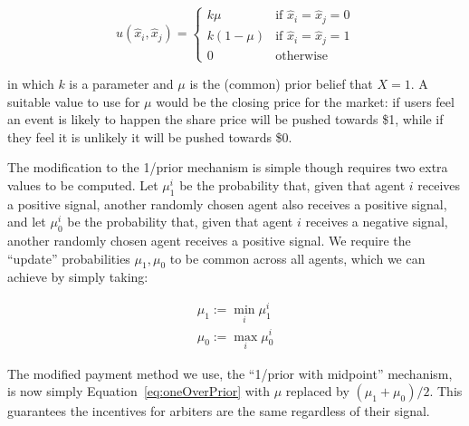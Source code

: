 \begin{equation}
	\label{eq:oneOverPrior}
	u(\hat{x}_i, \hat{x}_j) =
	\begin{cases}
		k \mu & \text{if } \hat{x}_i = \hat{x}_j = 0 \\
		k (1-\mu) & \text{if } \hat{x}_i = \hat{x}_j = 1 \\
		0 & \text{otherwise}
	\end{cases}
\end{equation}

in which $k$ is a parameter and $\mu$ is the (common) prior belief that $X=1$.
A suitable value to use for $\mu$ would be the closing price for the market: if
users feel an event is likely to happen the share price will be pushed towards
\$1, while if they feel it is unlikely it will be pushed towards \$0.

The modification to the 1/prior mechanism is simple though requires two extra
values to be computed. Let $\mu_1^i$ be the probability that, given that agent
$i$ receives a positive signal, another randomly chosen agent also receives a
positive signal, and let $\mu_0^i$ be the probability that, given that agent
$i$ receives a negative signal, another randomly chosen agent receives a
positive signal. We require the ``update'' probabilities $\mu_1, \mu_0$ to be
common across all agents, which we can achieve by simply taking:

\begin{equation}
	\begin{gathered}
		\mu_1 := \min_i \mu_1^i \\
		\mu_0 := \max_i \mu_0^i
	\end{gathered}
\end{equation}

The modified payment method we use, the ``1/prior with midpoint'' mechanism, is
now simply Equation~\ref{eq:oneOverPrior} with $\mu$ replaced by $(\mu_1 +
\mu_0)/2$. This guarantees the incentives for arbiters are the same regardless
of their signal.


